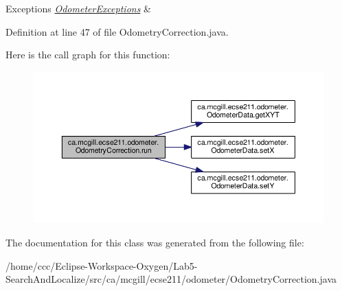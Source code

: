 \begin{DoxyExceptions}{Exceptions}
{\em \hyperlink{classca_1_1mcgill_1_1ecse211_1_1odometer_1_1_odometer_exceptions}{Odometer\+Exceptions}} & \\
\hline
\end{DoxyExceptions}


Definition at line 47 of file Odometry\+Correction.\+java.

Here is the call graph for this function\+:\nopagebreak
\begin{figure}[H]
\begin{center}
\leavevmode
\includegraphics[width=350pt]{classca_1_1mcgill_1_1ecse211_1_1odometer_1_1_odometry_correction_aad66a7030ac00f3a9cbe7bc33c25acbf_cgraph}
\end{center}
\end{figure}


The documentation for this class was generated from the following file\+:\begin{DoxyCompactItemize}
\item 
/home/ccc/\+Eclipse-\/\+Workspace-\/\+Oxygen/\+Lab5-\/\+Search\+And\+Localize/src/ca/mcgill/ecse211/odometer/Odometry\+Correction.\+java\end{DoxyCompactItemize}
